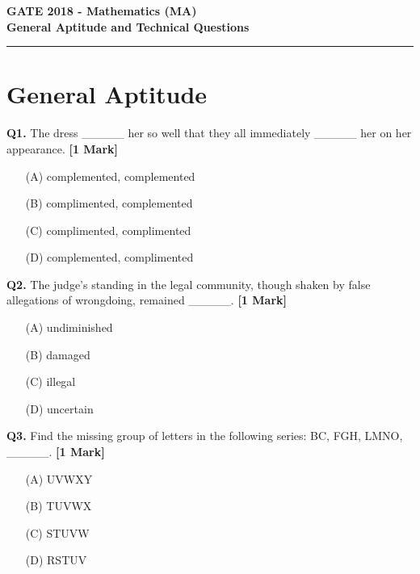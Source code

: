 \documentclass[11pt]{article}
\newcommand{\questiona}[2]{
    \noindent\textbf{Q#2.} #1 \hfill \textbf{[1 Mark]}
}
\begin{document}
\begin{center}
    \Large\textbf{GATE 2018 - Mathematics (MA)} \\
    \large\textbf{General Aptitude and Technical Questions} \\
    \rule{\textwidth}{0.5pt} %
\end{center}

\vspace{0.5cm}

\section*{General Aptitude}

\questiona{The dress \_\_\_\_\_ her so well that they all immediately \_\_\_\_\_ her on her appearance.}{1}
\begin{enumerate}
    \item[(A)] complemented, complemented  
    \item[(B)] complimented, complemented  
    \item[(C)] complimented, complimented  
    \item[(D)] complemented, complimented  
\end{enumerate}
\vspace{0.5cm}

\questiona{The judge’s standing in the legal community, though shaken by false allegations of wrongdoing, remained \_\_\_\_\_.}{2}
\begin{enumerate}
    \item[(A)] undiminished  
    \item[(B)] damaged  
    \item[(C)] illegal  
    \item[(D)] uncertain  
\end{enumerate}
\vspace{0.5cm}

\questiona{Find the missing group of letters in the following series: BC, FGH, LMNO, \_\_\_\_\_.}{3}
\begin{enumerate}
    \item[(A)] UVWXY  
    \item[(B)] TUVWX  
    \item[(C)] STUVW  
    \item[(D)] RSTUV  
\end{enumerate}
\vspace{0.5cm}
\end{document}
